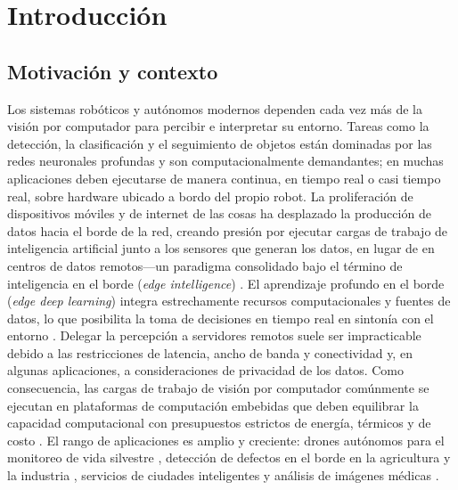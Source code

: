 %

\chapter{Introducción}
\label{chap:introduction}
\section{Motivación y contexto}
\label{sec:motivation}

Los sistemas robóticos y autónomos modernos dependen cada vez más de la visión
por computador para percibir e interpretar su entorno. Tareas como la
detección, la clasificación y el seguimiento de objetos están dominadas por
las redes neuronales profundas y son computacionalmente demandantes; en
muchas aplicaciones deben ejecutarse de manera continua, en tiempo real o
casi tiempo real, sobre hardware ubicado a bordo del propio robot. La
proliferación de dispositivos móviles y de internet de las cosas ha
desplazado la producción de datos hacia el borde de la red, creando presión
por ejecutar cargas de trabajo de inteligencia artificial junto a los
sensores que generan los datos, en lugar de en centros de datos remotos---un
paradigma consolidado bajo el término de inteligencia en el borde
(\emph{edge intelligence}) \cite{zhou2019, deng2020}. El aprendizaje profundo
en el borde (\emph{edge deep learning}) integra estrechamente recursos
computacionales y fuentes de datos, lo que posibilita la toma de decisiones
en tiempo real en sintonía con el entorno \cite{xu2025}. Delegar la
percepción a servidores remotos suele ser impracticable debido a las
restricciones de latencia, ancho de banda y conectividad y, en algunas
aplicaciones, a consideraciones de privacidad de los datos.
Como consecuencia, las cargas de trabajo de visión por computador comúnmente
se ejecutan en plataformas de computación embebidas que deben equilibrar la
capacidad computacional con presupuestos estrictos de energía, térmicos y de
costo \cite{zhou2019, xu2025}. El rango de aplicaciones es amplio y
creciente: drones autónomos para el monitoreo de vida silvestre
\cite{lundquist2026}, detección de defectos en el borde en la agricultura y
la industria \cite{muchtar2025, machado2025}, servicios de ciudades
inteligentes \cite{woo2025} y análisis de imágenes médicas \cite{aalishah2025}.

